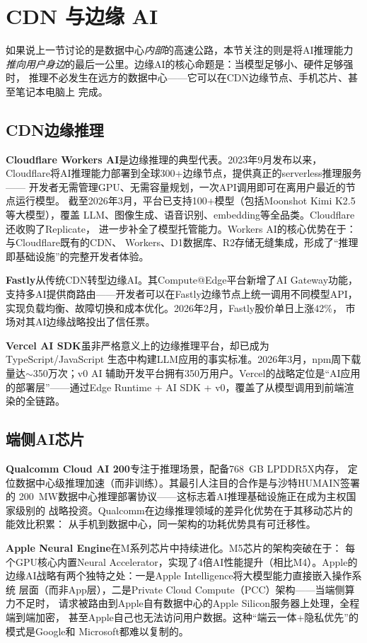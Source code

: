 \section{CDN 与边缘 AI}
\label{sec:infra-edge}

如果说上一节讨论的是数据中心\emph{内部}的高速公路，本节关注的则是将AI推理能力
\emph{推向用户身边}的最后一公里。边缘AI的核心命题是：当模型足够小、硬件足够强时，
推理不必发生在远方的数据中心——它可以在CDN边缘节点、手机芯片、甚至笔记本电脑上
完成。

\subsection{CDN边缘推理}

\textbf{Cloudflare Workers AI}是边缘推理的典型代表。2023年9月发布以来，
Cloudflare将AI推理能力部署到全球300+边缘节点，提供真正的serverless推理服务——
开发者无需管理GPU、无需容量规划，一次API调用即可在离用户最近的节点运行模型。
截至2026年3月，平台已支持100+模型（包括Moonshot Kimi K2.5等大模型），覆盖
LLM、图像生成、语音识别、embedding等全品类。Cloudflare还收购了Replicate，
进一步补全了模型托管能力。Workers AI的核心优势在于：与Cloudflare既有的CDN、
Workers、D1数据库、R2存储无缝集成，形成了``推理即基础设施''的完整开发者体验。

\textbf{Fastly}从传统CDN转型边缘AI。其Compute@Edge平台新增了AI Gateway功能，
支持多AI提供商路由——开发者可以在Fastly边缘节点上统一调用不同模型API，
实现负载均衡、故障切换和成本优化。2026年2月，Fastly股价单日上涨42\%，
市场对其AI边缘战略投出了信任票。

\textbf{Vercel AI SDK}虽非严格意义上的边缘推理平台，却已成为TypeScript/JavaScript
生态中构建LLM应用的事实标准。2026年3月，npm周下载量达$\sim$350万次；v0 AI
辅助开发平台拥有350万用户。Vercel的战略定位是``AI应用的部署层''——通过Edge
Runtime + AI SDK + v0，覆盖了从模型调用到前端渲染的全链路。

\subsection{端侧AI芯片}

\textbf{Qualcomm Cloud AI 200}专注于推理场景，配备768~GB LPDDR5X内存，
定位数据中心级推理加速（而非训练）。其最引人注目的合作是与沙特HUMAIN签署的
200~MW数据中心推理部署协议——这标志着AI推理基础设施正在成为主权国家级别的
战略投资。Qualcomm在边缘推理领域的差异化优势在于其移动芯片的能效比积累：
从手机到数据中心，同一架构的功耗优势具有可迁移性。

\textbf{Apple Neural Engine}在M系列芯片中持续进化。M5芯片的架构突破在于：
每个GPU核心内置Neural Accelerator，实现了4倍AI性能提升（相比M4）。Apple的
边缘AI战略有两个独特之处：一是Apple Intelligence将大模型能力直接嵌入操作系统
层面（而非App层），二是Private Cloud Compute（PCC）架构——当端侧算力不足时，
请求被路由到Apple自有数据中心的Apple Silicon服务器上处理，全程端到端加密，
甚至Apple自己也无法访问用户数据。这种``端云一体+隐私优先''的模式是Google和
Microsoft都难以复制的。

